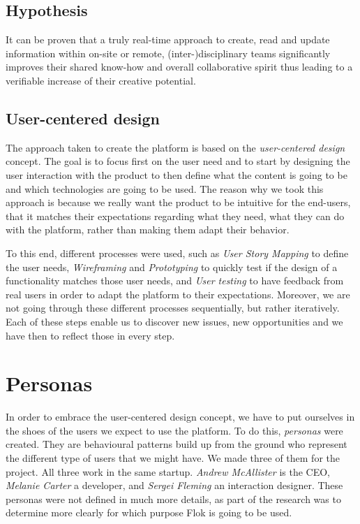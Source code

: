 \documentclass[a4paper,12pt, oneside]{article}
\begin{document}
\subsection{Hypothesis}
\label{hypothesis}
It can be proven that a truly real-time approach to create, read and update information within on-site or remote, (inter-)disciplinary teams significantly improves their shared know-how and overall collaborative spirit thus leading to a verifiable increase of their creative potential.

\subsection{User-centered design}
The approach taken to create the platform is based on the \emph{user-centered design} concept.
The goal is to focus first on the user need and to start by designing the user interaction with the product to then define what the content is going to be and which technologies are going to be used.
The reason why we took this approach is because we really want the product to be intuitive for the end-users, that it matches their expectations regarding what they need, what they can do with the platform, rather than making them adapt their behavior.

To this end, different processes were used, such as \emph{User Story Mapping} to define the user needs, \emph{Wireframing} and \emph{Prototyping} to quickly test if the design of a functionality matches those user needs, and \emph{User testing} to have feedback from real users in order to adapt the platform to their expectations.
Moreover, we are not going through these different processes sequentially, but rather iteratively.
Each of these steps enable us to discover new issues, new opportunities and we have then to reflect those in every step.


\section{Personas}
In order to embrace the user-centered design concept, we have to put ourselves in the shoes of the users we expect to use the platform. To do this, \emph{personas} were created.
They are behavioural patterns build up from the ground who represent the different type of users that we might have.
We made three of them for the project.
All three work in the same startup. \emph{Andrew McAllister} is the CEO, \emph{Melanie Carter} a developer, and \emph{Sergei Fleming} an interaction designer.
These personas were not defined in much more details, as part of the research was to determine more clearly for which purpose Flok is going to be used.
\end{document}
